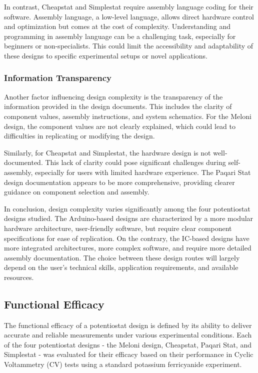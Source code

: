 \documentclass{article}
\begin{document}
In contrast, Cheapstat and Simplestat require assembly language coding for their software. Assembly language, a low-level language, allows direct hardware control and optimization but comes at the cost of complexity. Understanding and programming in assembly language can be a challenging task, especially for beginners or non-specialists. This could limit the accessibility and adaptability of these designs to specific experimental setups or novel applications.

\subsubsection*{Information Transparency}
Another factor influencing design complexity is the transparency of the information provided in the design documents. This includes the clarity of component values, assembly instructions, and system schematics. For the Meloni design, the component values are not clearly explained, which could lead to difficulties in replicating or modifying the design.

Similarly, for Cheapstat and Simplestat, the hardware design is not well-documented. This lack of clarity could pose significant challenges during self-assembly, especially for users with limited hardware experience. The Paqari Stat design documentation appears to be more comprehensive, providing clearer guidance on component selection and assembly.

In conclusion, design complexity varies significantly among the four potentiostat designs studied. The Arduino-based designs are characterized by a more modular hardware architecture, user-friendly software, but require clear component specifications for ease of replication. On the contrary, the IC-based designs have more integrated architectures, more complex software, and require more detailed assembly documentation. The choice between these design routes will largely depend on the user's technical skills, application requirements, and available resources.

\subsection*{Functional Efficacy}
The functional efficacy of a potentiostat design is defined by its ability to deliver accurate and reliable measurements under various experimental conditions. Each of the four potentiostat designs - the Meloni design, Cheapstat, Paqari Stat, and Simplestat - was evaluated for their efficacy based on their performance in Cyclic Voltammetry (CV) tests using a standard potassium ferricyanide experiment.
\end{document}
